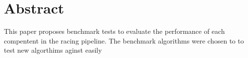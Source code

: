 \chapter{Abstract}
This paper proposes benchmark tests to evaluate the performance of each compentent in the racing pipeline. The benchmark algorithms were chosen to to test new algorthims aginst easily 